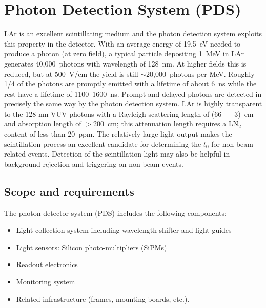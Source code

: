 
\section{Photon Detection System (PDS)}
\label{sec:pd_system}

LAr is an excellent scintillating medium and the photon detection
system exploits this property in the detector.  With an
average energy of 19.5~eV needed to produce a photon (at zero field),
a typical particle depositing 1~MeV in LAr generates
40,000~photons with wavelength of 128~nm. At higher fields this is 
reduced, but at 500~V/cm the yield is still $\sim$20,000~photons
per MeV. Roughly 1/4 of the photons are promptly emitted with a
lifetime of about 6~ns while the rest have a lifetime of
1100--1600~ns. Prompt and delayed photons are detected in
  precisely the same way by the photon detection system. LAr is
highly transparent to the 128-nm VUV photons with a Rayleigh
scattering length of (66~$\pm$~3)~cm~\cite{Rayleigh} and absorption
length of $>$200~cm; this attenuation length requires a LN$_2$
  content of less than 20~ppm. The relatively large light output makes
the scintillation process an excellent candidate for determining the
$t_0$ for non-beam related events. Detection of the scintillation
light may also be helpful in background rejection and triggering on
non-beam events.

\subsection{Scope and requirements}

The photon detector system (PDS) 
includes the following components:

\begin{itemize}
\item Light collection system including wavelength shifter and light guides
\item Light sensors: Silicon photo-multipliers (SiPMs)
\item Readout electronics
\item Monitoring system
\item Related infrastructure (frames, mounting boards, etc.).
\end{itemize}



